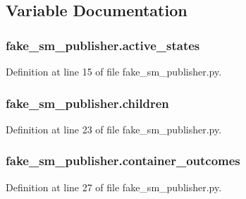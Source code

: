 \subsection{Variable Documentation}
\subsubsection[{\texorpdfstring{active\+\_\+states}{active_states}}]{\setlength{\rightskip}{0pt plus 5cm}fake\+\_\+sm\+\_\+publisher.\+active\+\_\+states}\hypertarget{namespacefake__sm__publisher_ac6f3345f76de63e387bb2fba2f8fa332}{}\label{namespacefake__sm__publisher_ac6f3345f76de63e387bb2fba2f8fa332}


Definition at line 15 of file fake\+\_\+sm\+\_\+publisher.\+py.

\subsubsection[{\texorpdfstring{children}{children}}]{\setlength{\rightskip}{0pt plus 5cm}fake\+\_\+sm\+\_\+publisher.\+children}\hypertarget{namespacefake__sm__publisher_af182a8a95f6299c8a2e9e2b1a026fb46}{}\label{namespacefake__sm__publisher_af182a8a95f6299c8a2e9e2b1a026fb46}


Definition at line 23 of file fake\+\_\+sm\+\_\+publisher.\+py.

\subsubsection[{\texorpdfstring{container\+\_\+outcomes}{container_outcomes}}]{\setlength{\rightskip}{0pt plus 5cm}fake\+\_\+sm\+\_\+publisher.\+container\+\_\+outcomes}\hypertarget{namespacefake__sm__publisher_adf5bac55bf7136288c34e47310c47be6}{}\label{namespacefake__sm__publisher_adf5bac55bf7136288c34e47310c47be6}


Definition at line 27 of file fake\+\_\+sm\+\_\+publisher.\+py.

